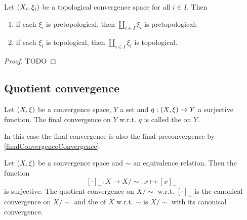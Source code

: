 \begin{proposition} \label{pretopologicalCoproductConvergence}
Let $\left( X_i, \xi_i \right)$ be a topological convergence space for all $i\in I$. Then
\begin{enumerate}
\item if each $\xi_i$ is pretopological, then $\coprod_{i\in I} \xi_i$ is pretopological;
\item if each $\xi_i$ is topological, then $\coprod_{i\in I} \xi_i$ is topological.
\end{enumerate}
\end{proposition}
\begin{proof}
TODO
\end{proof}

\subsection{Quotient convergence}
\begin{definition}
Let $\left( X,\xi \right)$ be a convergence space, $Y$ a set and $q: \left( X,\xi \right)\to Y$ a surjective function. The final convergence on $Y$ w.r.t. $q$ is called the  on $Y$.
\end{definition}

In this case the final convergence is also the final preconvergence by \ref{finalConvergenceConvergence}.

\begin{example}
Let $\left( X,\xi \right)$ be a convergence space and $\sim$ an equivalence relation. Then the function
\[ [\cdot]_\sim: X\to X/{\sim}: x\mapsto [x]_\sim \]
is surjective. The quotient convergence on $X/{\sim}$ w.r.t. $[\cdot]_\sim$ is the canonical convergence on $X/{\sim}$ and the  of $X$ w.r.t. $\sim$ is $X/{\sim}$ with its canonical convergence.
\end{example}

